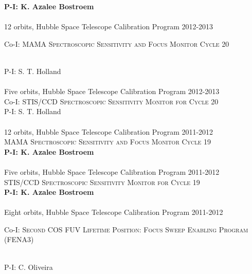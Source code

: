 \documentclass[10pt]{cv}
\begin{document}
\begin{llist}
{\bf P-I: K. Azalee Bostroem} \\ %
\\
12 orbits, Hubble Space Telescope Calibration Program \hfill  2012-2013\\ %
\begin{minipage}[l]{0.7\textwidth}\vspace{0.15cm}
Co-I: \textsc{MAMA Spectroscopic Sensitivity and Focus Monitor Cycle 20}
\end{minipage}\vspace{0.15cm}\\
P-I: S. T. Holland\\ %
\\
Five orbits, Hubble Space Telescope Calibration Program \hfill  2012-2013\\ %
Co-I: \textsc{STIS/CCD Spectroscopic Sensitivity Monitor for Cycle 20} \\
P-I: S. T. Holland\\ %
\\
12 orbits, Hubble Space Telescope Calibration Program \hfill 2011-2012\\ %
\textsc{MAMA Spectroscopic Sensitivity and Focus Monitor Cycle 19}\\
{\bf P-I: K. Azalee Bostroem} \\ %
\\
Five orbits, Hubble Space Telescope Calibration Program \hfill 2011-2012\\ %
\textsc{STIS/CCD Spectroscopic Sensitivity Monitor for Cycle 19}\\
{\bf P-I: K. Azalee Bostroem} \\ %
\\
Eight orbits, Hubble Space Telescope Calibration Program \hfill 2011-2012\\ %
\begin{minipage}[l]{0.7\textwidth}\vspace{0.15cm}
Co-I: \textsc{Second COS FUV Lifetime Position: Focus Sweep Enabling Program (FENA3)} 
\end{minipage}\vspace{0.15cm}\\
P-I: C. Oliveira \\%
\\

\end{llist}
\end{document}
